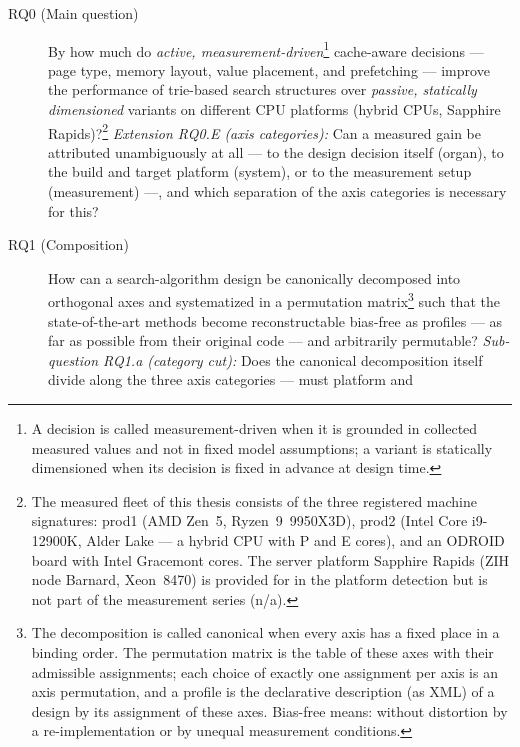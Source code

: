 \begin{description}
  \item[RQ0 (Main question)] By how much do \emph{active, measurement-driven}\footnote{A decision is
  called measurement-driven when it is grounded in collected measured values and not in fixed model
  assumptions; a variant is statically dimensioned when its decision is fixed in advance at design time.}
  cache-aware
  decisions --- page type, memory layout, value placement, and prefetching --- improve the performance of
  trie-based search structures over \emph{passive, statically dimensioned} variants on
  different CPU platforms (hybrid CPUs, Sapphire
  Rapids)?\footnote{The measured fleet of this thesis consists of the three registered
  machine signatures: prod1 (AMD Zen~5, Ryzen~9~9950X3D), prod2 (Intel Core i9-12900K, Alder Lake --- %
  a hybrid CPU with P and E cores), and an ODROID board with Intel Gracemont cores. The
  server platform Sapphire
  Rapids (ZIH node Barnard, Xeon~8470) is provided for in the platform detection but is not part of the
  measurement series (n/a).}
  \emph{Extension RQ0.E (axis categories):} Can a measured gain be attributed unambiguously at all
  --- to the design decision itself (organ), to the build and target platform (system), or to
  the measurement setup (measurement) ---, and which separation of the axis categories is necessary for this?
  \item[RQ1 (Composition)] How can a search-algorithm design be canonically decomposed into orthogonal
  axes and systematized in a permutation matrix\footnote{The decomposition is called canonical when every
  axis has a fixed place in a binding order. The permutation matrix is the
  table of these axes with their admissible assignments; each choice of exactly one assignment per axis is
  an axis permutation, and a profile is the declarative description (as XML) of a design
  by its assignment of these axes. Bias-free means: without distortion by a re-implementation
  or by unequal measurement conditions.} such that the
  state-of-the-art methods become reconstructable bias-free as profiles --- as far as possible from
  their original code --- and arbitrarily permutable? \emph{Sub-question RQ1.a (category cut):} Does
  the canonical decomposition itself divide along the three axis categories --- must platform and

\end{description}

